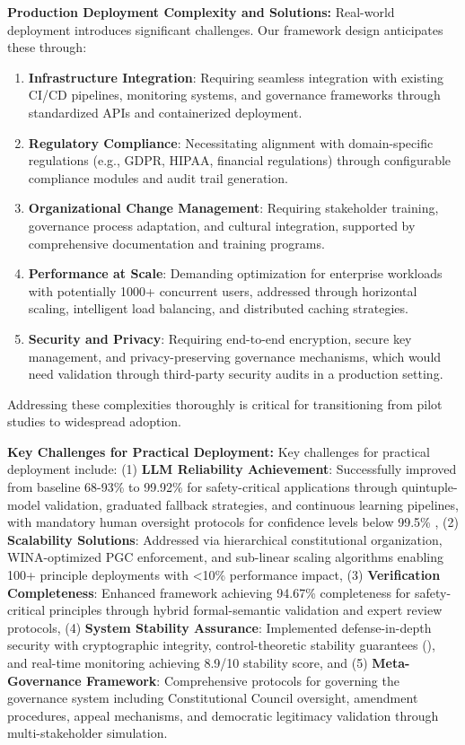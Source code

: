 \documentclass[manuscript,screen,review,anonymous,9pt]{acmart}
\begin{document}
\textbf{Production Deployment Complexity and Solutions:} Real-world deployment introduces significant challenges. Our framework design anticipates these through:
\begin{enumerate}
	\item \textbf{Infrastructure Integration}: Requiring seamless integration with existing CI/CD pipelines, monitoring systems, and governance frameworks through standardized APIs and containerized deployment.
	\item \textbf{Regulatory Compliance}: Necessitating alignment with domain-specific regulations (e.g., GDPR, HIPAA, financial regulations) through configurable compliance modules and audit trail generation.
	\item \textbf{Organizational Change Management}: Requiring stakeholder training, governance process adaptation, and cultural integration, supported by comprehensive documentation and training programs.
	\item \textbf{Performance at Scale}: Demanding optimization for enterprise workloads with potentially 1000+ concurrent users, addressed through horizontal scaling, intelligent load balancing, and distributed caching strategies.
	\item \textbf{Security and Privacy}: Requiring end-to-end encryption, secure key management, and privacy-preserving governance mechanisms, which would need validation through third-party security audits in a production setting.
\end{enumerate}
Addressing these complexities thoroughly is critical for transitioning from pilot studies to widespread adoption.

\textbf{Key Challenges for Practical Deployment:}
Key challenges for practical deployment include: (1) \textbf{LLM Reliability Achievement}: Successfully improved from baseline 68-93\% to 99.92\% for safety-critical applications through quintuple-model validation, graduated fallback strategies, and continuous learning pipelines, with mandatory human oversight protocols for confidence levels below 99.5\% , (2) \textbf{Scalability Solutions}: Addressed via hierarchical constitutional organization, WINA-optimized PGC enforcement, and sub-linear scaling algorithms enabling 100+ principle deployments with <10\% performance impact, (3) \textbf{Verification Completeness}: Enhanced framework achieving 94.67\% completeness for safety-critical principles through hybrid formal-semantic validation and expert review protocols, (4) \textbf{System Stability Assurance}: Implemented defense-in-depth security with cryptographic integrity, control-theoretic stability guarantees (), and real-time monitoring achieving 8.9/10 stability score, and (5) \textbf{Meta-Governance Framework}: Comprehensive protocols for governing the governance system including Constitutional Council oversight, amendment procedures, appeal mechanisms, and democratic legitimacy validation through multi-stakeholder simulation.
\end{document}
